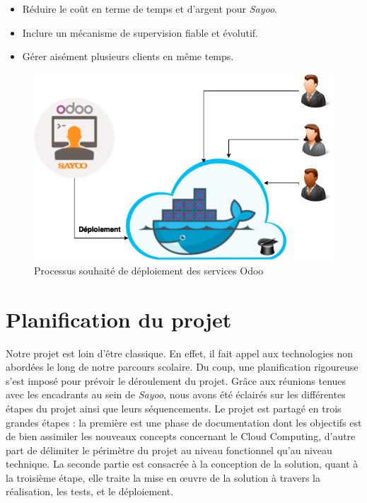 \begin{onehalfspace}
\begin{itemize}
\item Réduire le coût en terme de temps et d'argent pour \emph{Sayoo}.

\item Inclure un mécanisme de supervision fiable et évolutif.

\item Gérer aisément plusieurs clients en même temps.  
 
 \end{itemize}

\begin{figure}[H]
\centering
\includegraphics [scale=0.7]{chapitre1/assets/sayoo2}
\caption{Processus souhaité de déploiement des services Odoo}
\label{fig:}
\end{figure}





\section{Planification du projet}

Notre projet est loin d'être classique. En effet, il fait appel aux technologies non abordées le long de notre parcours scolaire. Du coup, une planification rigoureuse s'est imposé pour prévoir le déroulement du projet. Grâce aux réunions tenues avec les encadrants au sein de \emph{Sayoo}, nous avons été éclairés sur les différentes étapes du projet ainsi que leurs séquencements. Le projet est partagé en trois grandes étapes : la première est une phase de documentation dont les objectifs est de bien assimiler les nouveaux concepts concernant le Cloud Computing, d'autre part de délimiter le périmètre du projet au niveau fonctionnel qu'au niveau technique. La seconde partie est consacrée à la conception de la solution, quant à la troisième étape, elle traite la mise en œuvre de la solution à travers la réalisation, les tests, et le déploiement.


\end{onehalfspace}
